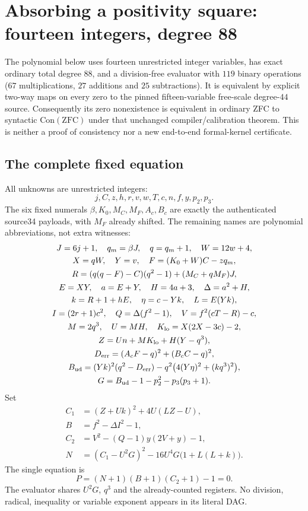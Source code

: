 \section{Absorbing a positivity square: fourteen integers, degree 88}
\label{sec:positive-root14}
The polynomial below uses fourteen unrestricted integer variables, has exact
ordinary total degree $88$, and a division-free evaluator with $119$ binary
operations ($67$ multiplications, $27$ additions and $25$ subtractions).
It is equivalent by explicit two-way maps on every zero to the pinned
fifteen-variable free-scale degree-$44$ source. Consequently its zero
nonexistence is equivalent in ordinary ZFC to syntactic $\mathrm{Con}(\mathrm{ZFC})$
under that unchanged compiler/calibration theorem. This is neither a proof of
consistency nor a new end-to-end formal-kernel certificate.

\subsection{The complete fixed equation}
All unknowns are unrestricted integers:
\[
 j,C,z,h,r,v,w,T,c,n,f,y,p_2,p_3.
\]
The six fixed numerals $\beta,K_0,M_C,M_F,A_c,B_c$ are exactly the authenticated
source34 payloads, with $M_F$ already shifted. The remaining names are polynomial
abbreviations, not extra witnesses:
\begin{gather*}
 J=6j+1,\quad q_m=\beta J,\quad q=q_m+1,\quad W=12w+4,\\
 X=qW,\quad Y=v,\quad F=(K_0+W)C-zq_m,\\
 R=(q(q-F)-C)(q^2-1)+(M_C+qM_F)J,\\
 E=XY,\quad a=E+Y,\quad H=4a+3,\quad\Delta=a^2+H,\\
 k=R+1+hE,\quad \eta=c-Yk,\quad L=E(Yk),\\
 I=(2r+1)c^2,\quad Q=\Delta(f^2-1),\quad V=f^2(cT-R)-c,\\
 M=2q^3,\quad U=MH,\quad K_{\rm lo}=X(2X-3c)-2,\\
 Z=Un+MK_{\rm lo}+H(Y-q^3),\\
 D_{\rm err}=(A_cF-q)^2+(B_cC-q)^2,\\
 B_{\rm ud}=(Yk)^2(q^2-D_{\rm err})
       -q^2\bigl(4(Y\eta)^2+(kq^3)^2\bigr),\\
 G=B_{\rm ud}-1-p_2^2-p_3(p_3+1).
\end{gather*}
Set
\begin{align*}
 C_1&=(Z+Uk)^2+4U(LZ-U),\\
 B&=f^2-\Delta I^2-1,\\
 C_2&=V^2-(Q-1)y(2V+y)-1,\\
 N&=(C_1-U^2G)^2-16U^4G\bigl(1+L(L+k)\bigr).
\end{align*}
The single equation is
\[
 \boxed{P=(N+1)(B+1)(C_2+1)-1=0.}
\]
The evaluator shares $U^2G$, $q^3$ and the already-counted registers. No division,
radical, inequality or variable exponent appears in its literal DAG.

